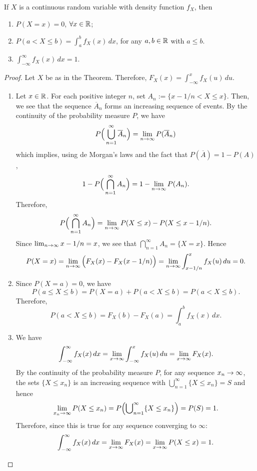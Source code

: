 \begin{theorem}
If $X$ is a continuous random variable with density function $f_X$, then
    \begin{enumerate}[label=\alph*)]
        \item $P (X  = x) = 0$, $\forall x \in \mathbb{R}$;
        \item $P (a < X \leq b) = \displaystyle \int_a^b f_X (x) \, dx$, for any $a, b \in \mathbb{R}$ with $a \leq b$.
        \item $\displaystyle\int_{-\infty}^\infty f_X (x) \, dx = 1$. 
    \end{enumerate}
\end{theorem}
\begin{proof}
Let $X$ be as in the Theorem. Therefore, $F_X (x) = \displaystyle \int_{-\infty}^x f_X (u) \, du$.
    \begin{enumerate}[label=\alph*)]
        \item Let $x \in \mathbb{R}$. For each positive integer $n$, set $A_n := \{ x - 1/n < X \leq x \}$. Then, we see that the sequence $\overline{A}_n$ forms an increasing sequence of events. By the continuity of the probability measure $P$, we have
        \[
            P \Big( \bigcup_{n = 1}^\infty \overline{A}_n \Big) = \lim_{n \rightarrow \infty} P (\overline{A}_n )
        \]
        which implies, using de Morgan's laws and the fact that $P (\overline{A}) = 1 - P (A)$,
        \[
            1 - P \Big( \bigcap_{n = 1}^\infty A_n \Big) = 1 - \lim_{n \rightarrow \infty} P (A_n ) .
        \]
        Therefore,
            \[
                P \Big( \bigcap_{n = 1}^\infty A_n \Big) = \lim_{n \rightarrow \infty} P (X \leq x ) - P (X \leq x - 1/n ) .
            \]
        Since $\lim_{n \rightarrow \infty} x - 1/n = x$, we see that $\bigcap_{n = 1}^\infty A_n = \{ X = x \}$. Hence
            \[
                P (X = x) = \lim_{n \rightarrow \infty} \Big( F_X (x) - F_X (x - 1/n ) \Big) = \lim_{n \rightarrow \infty} \int_{x - 1/n}^x f_X (u) \, du = 0 .
            \]
        \item Since $P (X = a ) = 0$, we have 
            \[
                P (a \leq X \leq b) = P (X = a) + P (a < X \leq b ) = P (a < X \leq b ) .
            \]
        Therefore,
            \[
                P (a < X \leq b) = F_X (b) - F_X (a) = \int_a^b f_X (x) \, dx .
            \]
        \item We have
            \[
                \int_{-\infty}^\infty f_X (x ) \, dx = \lim_{x \rightarrow \infty} \int_{-\infty}^x f_X (u) \, du = \lim_{x \rightarrow \infty} F_X (x) .
            \]
        By the continuity of the probability measure $P$, for any sequence $x_n \rightarrow \infty$, the sets $\{ X \leq x_n \}$ is an increasing sequence with $\bigcup_{n= 1}^\infty \{ X \leq x_n \} = S$ and hence 
            \[
                \lim_{x_n \rightarrow \infty} P (X \leq x_n ) = P \Big( {\bigcup}_{n=1}^\infty \{ X \leq x_n \} \Big) = P (S) = 1 .
            \]
        Therefore, since this is true for any sequence converging to $\infty$:
            \[
                \int_{-\infty}^\infty f_X (x) \, dx = \lim_{x \rightarrow \infty} F_X (x) = \lim_{x \rightarrow \infty} P (X \leq x) = 1 . \qedhere
            \]
    \end{enumerate}
\end{proof}

